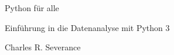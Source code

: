 \begin{titlepage}
\begin{center}
\vspace*{30mm}

\sffamily
\LARGE
Python für alle

\large
Einführung in die Datenanalyse mit Python 3

\vspace{15mm}

\large
Charles R. Severance
\end{center}
\end{titlepage}

\normalsize
\normalfont
